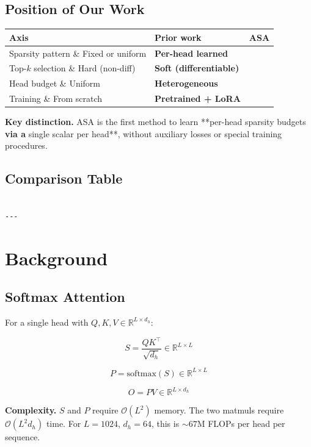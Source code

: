 \subsection{Position of Our Work}

\begin{table}[H]
\centering
\small
\begin{tabular}{lll}
\toprule
\textbf{Axis} & \textbf{Prior work} & \textbf{ASA} \\
\midrule
Sparsity pattern \& Fixed or uniform & \textbf{Per-head learned} \\
Top-$k$ selection \& Hard (non-diff) & \textbf{Soft (differentiable)} \\
Head budget \& Uniform & \textbf{Heterogeneous} \\
Training \& From scratch & \textbf{Pretrained + LoRA} \\
\bottomrule
\end{tabular}
\end{table}

\textbf{Key distinction.} ASA is the first method to learn **per-head sparsity 
budgets\textbf{ via a }single scalar per head**, without auxiliary losses or 
special training procedures.

\subsection{Comparison Table}

\begin{lstlisting}

---
\end{lstlisting}


\section{Background}

\subsection{Softmax Attention}

For a single head with $Q, K, V \in \mathbb{R}^{L \times d_h}$:

\[
S = \frac{Q K^\top}{\sqrt{d_h}} \in \mathbb{R}^{L \times L}
\]

\[
P = \text{softmax}(S) \in \mathbb{R}^{L \times L}
\]

\[
O = P V \in \mathbb{R}^{L \times d_h}
\]

\textbf{Complexity.} $S$ and $P$ require $\mathcal{O}(L^2)$ memory. The two 
matmuls require $\mathcal{O}(L^2 d_h)$ time. For $L = 1024$, $d_h = 64$, 
this is $\sim 67$M FLOPs per head per sequence.

